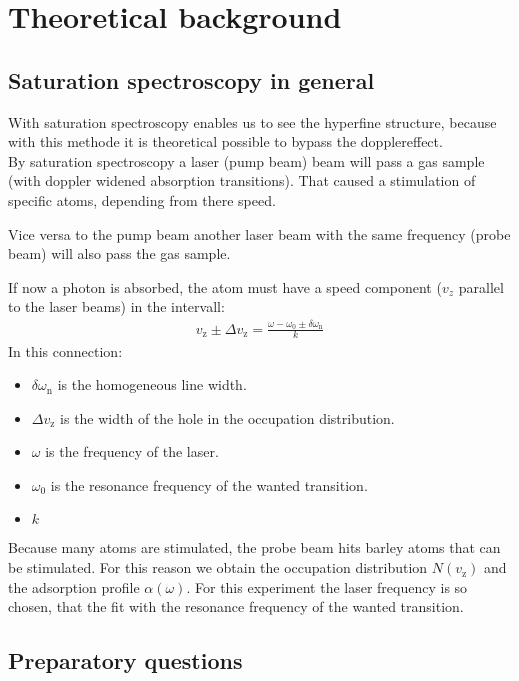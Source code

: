 \chapter{Theoretical background}

\section{Saturation spectroscopy in general}
With saturation spectroscopy enables us to see the hyperfine structure, because with this methode it is theoretical possible to bypass the dopplereffect. \\
By saturation spectroscopy a laser (pump beam) beam will pass a gas sample (with doppler widened absorption transitions). That caused a stimulation of specific atoms, depending from there speed. 

Vice versa to the pump beam another laser beam with the same frequency (probe beam) will also pass the gas sample.

If now a photon is absorbed, the atom must have a speed component ($v_z$ parallel to the laser beams) in the intervall: 
\begin{align}
    v_{\text{z}} \pm \Delta v_{\text{z}} = \frac{\omega -\omega_0 \pm \delta \omega_{\text{n}}}{k}
\end{align}
In this connection: 
\begin{itemize} 
    \item $\delta \omega_{\text{n}}$ is the homogeneous line width.
    \item $\Delta v_{\text{z}}$ is the width of the hole in the occupation distribution.
    \item $\omega$ is the frequency of the laser.
    \item $\omega_0$ is the resonance frequency of the wanted transition.
    \item $k$ 
\end{itemize}

Because many atoms are stimulated, the probe beam hits barley atoms that can be stimulated. For this reason we obtain the occupation distribution $N(v_{\text{z}})$ and the adsorption profile $\alpha(\omega)$. For this experiment the laser frequency is so chosen, that the fit with the resonance frequency of the wanted transition.

\section{Preparatory questions}

